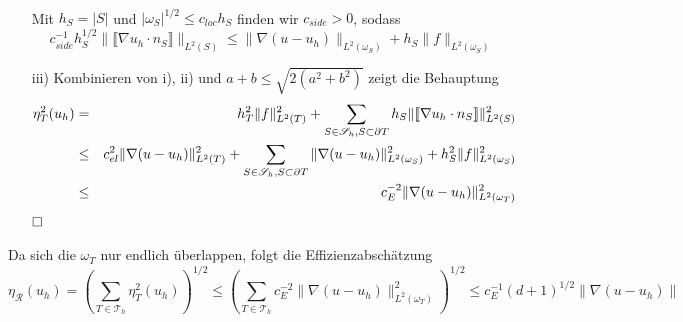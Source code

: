 \begin{itemize}
\begin{eqnarray*}
	\end{eqnarray*}
	Mit $h_S =|S|$ und $|\omega_S|^{1/2} \leq c_{loc}h_S$ finden wir $c_{side}>0$, sodass	
	\[
	c_{side}^{-1}h_S^{1/2} \|\llbracket \nabla u_h \cdot n_S\rrbracket\|_{L^2(S)} \leq \|\nabla (u-u_h)\|_{L^2(\omega_S)} +h_S\|f\|_{L^2(\omega_S)}
	\]
	\item[iii)]
	Kombinieren von i), ii) und $a+b\leq \sqrt{2(a^2+b^2)}$ zeigt die Behauptung
	\begin{eqnarray*}
		\eta^2_T(u_h) &=& h^2_T\|f\|^2_{L^2(T)} + \sum_{S\in\mathscr{S}_h,S\subset\partial T} h_S\|\llbracket \nabla u_h \cdot n_S\rrbracket\|^2_{L^2(S)} \\
		&\leq& c_{el}^2 \|\nabla (u-u_h)\|_{L^2(T)}^2 + \sum_{S\in\mathscr{S}_h,S\subset\partial T}\|\nabla (u-u_h)\|_{L^2(\omega_S)}^2 +h_S^2\|f\|_{L^2(\omega_S)}^2\\
		&\leq&  c_E^{-2}\|\nabla (u-u_h)\|_{L^2(\omega_T)}^2
	\end{eqnarray*}
$\hfill \Box$
\end{itemize}
Da sich die $\omega_T$ nur endlich überlappen, folgt die Effizienzabschätzung
\[
\eta_\mathscr{R}(u_h) = \left( \sum_{T\in\mathscr{T}_h} \eta^2_T(u_h)\right)^{1/2} \leq \left( \sum_{T\in\mathscr{T}_h} c_E^{-2}\|\nabla (u-u_h)\|_{L^2(\omega_T)}^2\right)^{1/2} \leq c_E^{-1}(d+1)^{1/2} \|\nabla(u-u_h)\|
\]